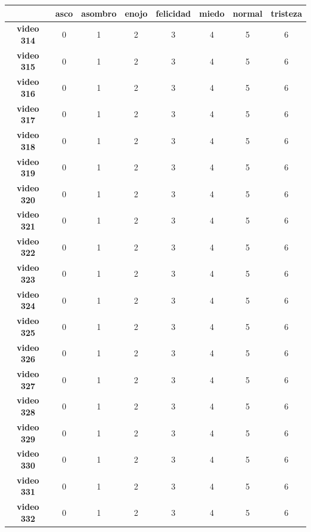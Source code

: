 \begin{table}[]
\centering
\begin{tabular}{c|c|c|c|c|c|c|c|}
\cline{2-8} 
\multicolumn{1}{l|}{} & \textbf{asco} & \textbf{asombro} & \textbf{enojo} & \textbf{felicidad} & \textbf{miedo} & \textbf{normal} & \textbf{tristeza} \\ \hline
\multicolumn{1}{|c|}{\textbf{video 314}} & 0 & 1 & 2 & 3 & 4 & 5 & 6 \\ \hline
\multicolumn{1}{|c|}{\textbf{video 315}} & 0 & 1 & 2 & 3 & 4 & 5 & 6 \\ \hline
\multicolumn{1}{|c|}{\textbf{video 316}} & 0 & 1 & 2 & 3 & 4 & 5 & 6 \\ \hline
\multicolumn{1}{|c|}{\textbf{video 317}} & 0 & 1 & 2 & 3 & 4 & 5 & 6 \\ \hline
\multicolumn{1}{|c|}{\textbf{video 318}} & 0 & 1 & 2 & 3 & 4 & 5 & 6 \\ \hline
\multicolumn{1}{|c|}{\textbf{video 319}} & 0 & 1 & 2 & 3 & 4 & 5 & 6 \\ \hline
\multicolumn{1}{|c|}{\textbf{video 320}} & 0 & 1 & 2 & 3 & 4 & 5 & 6 \\ \hline
\multicolumn{1}{|c|}{\textbf{video 321}} & 0 & 1 & 2 & 3 & 4 & 5 & 6 \\ \hline
\multicolumn{1}{|c|}{\textbf{video 322}} & 0 & 1 & 2 & 3 & 4 & 5 & 6 \\ \hline
\multicolumn{1}{|c|}{\textbf{video 323}} & 0 & 1 & 2 & 3 & 4 & 5 & 6 \\ \hline
\multicolumn{1}{|c|}{\textbf{video 324}} & 0 & 1 & 2 & 3 & 4 & 5 & 6 \\ \hline
\multicolumn{1}{|c|}{\textbf{video 325}} & 0 & 1 & 2 & 3 & 4 & 5 & 6 \\ \hline
\multicolumn{1}{|c|}{\textbf{video 326}} & 0 & 1 & 2 & 3 & 4 & 5 & 6 \\ \hline
\multicolumn{1}{|c|}{\textbf{video 327}} & 0 & 1 & 2 & 3 & 4 & 5 & 6 \\ \hline
\multicolumn{1}{|c|}{\textbf{video 328}} & 0 & 1 & 2 & 3 & 4 & 5 & 6 \\ \hline
\multicolumn{1}{|c|}{\textbf{video 329}} & 0 & 1 & 2 & 3 & 4 & 5 & 6 \\ \hline
\multicolumn{1}{|c|}{\textbf{video 330}} & 0 & 1 & 2 & 3 & 4 & 5 & 6 \\ \hline
\multicolumn{1}{|c|}{\textbf{video 331}} & 0 & 1 & 2 & 3 & 4 & 5 & 6 \\ \hline
\multicolumn{1}{|c|}{\textbf{video 332}} & 0 & 1 & 2 & 3 & 4 & 5 & 6 \\ \hline

\end{tabular}
\end{table}
